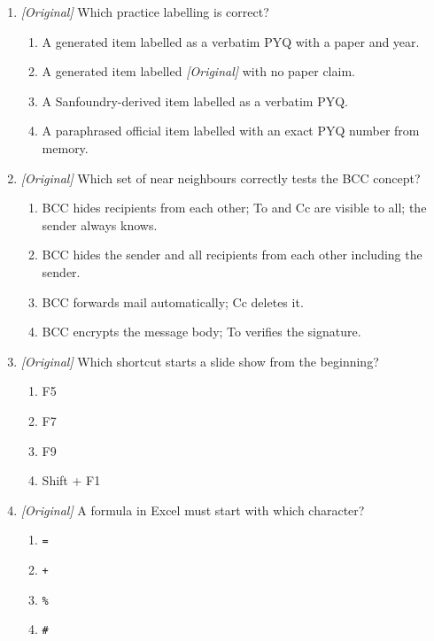 \documentclass[11pt]{article}
\begin{document}
\begin{enumerate}[label=\textbf{Q\arabic*.}, leftmargin=*]
\begin{enumerate}[label=\Alph*.]
    \item Memorise the provisional answer, since it came first.
    \item Follow the final key, flag the stem wording, and teach the stable concept.
    \item Follow the Tier-2 bank instead of either key.
    \item Drop the whole topic from revision.
  \end{enumerate}
\item \textit{[Original]} Which practice labelling is correct?
  \begin{enumerate}[label=\Alph*.]
    \item A generated item labelled as a verbatim PYQ with a paper and year.
    \item A generated item labelled \textit{[Original]} with no paper claim.
    \item A Sanfoundry-derived item labelled as a verbatim PYQ.
    \item A paraphrased official item labelled with an exact PYQ number from memory.
  \end{enumerate}
\item \textit{[Original]} Which set of near neighbours correctly tests the BCC concept?
  \begin{enumerate}[label=\Alph*.]
    \item BCC hides recipients from each other; To and Cc are visible to all; the sender always knows.
    \item BCC hides the sender and all recipients from each other including the sender.
    \item BCC forwards mail automatically; Cc deletes it.
    \item BCC encrypts the message body; To verifies the signature.
  \end{enumerate}
\item \textit{[Original]} Which shortcut starts a slide show from the beginning?
  \begin{enumerate}[label=\Alph*.]
    \item F5
    \item F7
    \item F9
    \item Shift + F1
  \end{enumerate}
\item \textit{[Original]} A formula in Excel must start with which character?
  \begin{enumerate}[label=\Alph*.]
    \item \texttt{=}
    \item \texttt{+}
    \item \texttt{\%}
    \item \texttt{\#}
  \end{enumerate}


\end{enumerate}
\end{document}
